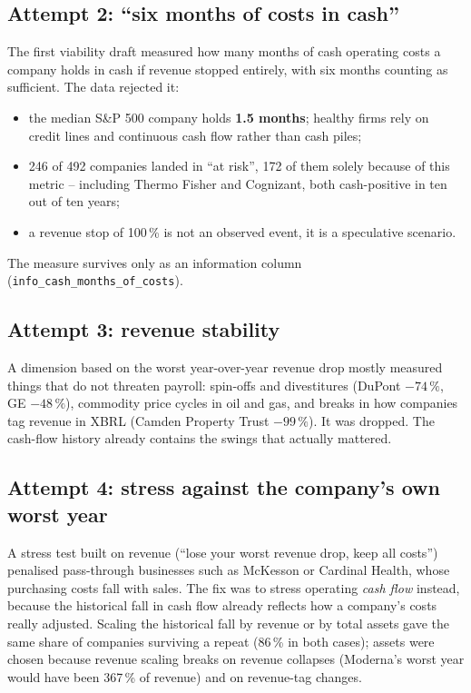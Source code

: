 \documentclass[11pt,a4paper]{article}
\newcommand{\code}[1]{\texttt{\small #1}}
\begin{document}
\subsection{Attempt 2: ``six months of costs in cash''}
The first viability draft measured how many months of cash operating costs a company holds in cash if revenue stopped entirely, with six months counting as sufficient. The data rejected it:
\begin{itemize}
  \item the median S\&P 500 company holds \textbf{1.5 months}; healthy firms rely on credit lines and continuous cash flow rather than cash piles;
  \item 246 of 492 companies landed in ``at risk'', 172 of them solely because of this metric -- including Thermo Fisher and Cognizant, both cash-positive in ten out of ten years;
  \item a revenue stop of 100\,\% is not an observed event, it is a speculative scenario.
\end{itemize}
The measure survives only as an information column (\code{info\_cash\_months\_of\_costs}).

\subsection{Attempt 3: revenue stability}
A dimension based on the worst year-over-year revenue drop mostly measured things that do not threaten payroll: spin-offs and divestitures (DuPont $-74\,\%$, GE $-48\,\%$), commodity price cycles in oil and gas, and breaks in how companies tag revenue in XBRL (Camden Property Trust $-99\,\%$). It was dropped. The cash-flow history already contains the swings that actually mattered.

\subsection{Attempt 4: stress against the company's own worst year}
A stress test built on revenue (``lose your worst revenue drop, keep all costs'') penalised pass-through businesses such as McKesson or Cardinal Health, whose purchasing costs fall with sales. The fix was to stress operating \emph{cash flow} instead, because the historical fall in cash flow already reflects how a company's costs really adjusted. Scaling the historical fall by revenue or by total assets gave the same share of companies surviving a repeat (86\,\% in both cases); assets were chosen because revenue scaling breaks on revenue collapses (Moderna's worst year would have been 367\,\% of revenue) and on revenue-tag changes.
\end{document}
